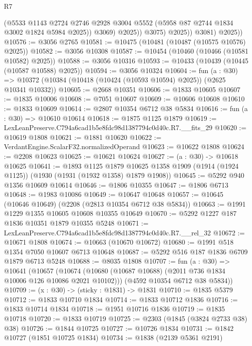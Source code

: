 \begin{lexlean}{R7}
\begin{coremodule}
                      (@5533
                        @1143
                        @2724
                        @2746
                        @2928
                        @3004
                        @5552
                        (@5958 @87 @2744 @1834 @3002 @1824 @5984 @2025))
                      @3069)
                    @2025))
                @3075)
              @2025))
          @3081)
        @2025))
@10576 := @3056 @2765
@10581 := @10475 (@10481 (@10487 (@10575 @10576) @2025))
@10582 := @3056 @10308
@10587 := @10454 (@10460 (@10466 (@10581 @10582) @2025))
@10588 := @3056 @10316
@10593 := @10433 (@10439 (@10445 (@10587 @10588) @2025))
@10594 := @3056 @10324
@10604 := fun (a : @30) =>
  @10372 (@10384 (@10418 (@10424 (@10593 @10594) @2025)) (@2625 @10341 @10332))
@10605 := @2668 @10351
@10606 := @1833 @10605
@10607 := @1835 @10006
@10608 := @7051 @10607
@10609 := @10606 @10608
@10610 := @1833 @10609
@10614 := @2807 @10354 @6712 @38 @5834
@10616 := fun (a : @30) => @10610 @10614
@10618 := @1875 @1125 @1879
@10619 := LexLeanPreserve.C794a6cad1b5e8fdc98d1387794c0d40c.R7.__fits_29
@10620 := @10619 @1808
@10621 := @1881 @10620
@10622 := VerdantEngine.ScalarF32.normalizedOperand
@10623 := @10622 @1808
@10624 := @2208 @10623
@10625 := @10621 @10624
@10627 := (a : @30) -> @10618 @10625
@10641 := @1893
    @1125
    @1879
    @10625
    @1358
    @1909
    (@1914 (@1924 @1125))
    (@1930 (@1931 (@1932 @1358) @1879 @1908))
@10645 := @5292 @940 @1356 @10609 @10614
@10646 := @1806 @10355
@10647 := @1806 @6713
@10648 := @1983 @10086
@10649 := @10647 @10648
@10657 := @10645 (@10646 @10649) (@2208 (@2813 @10354 @6712 @38 @5834))
@10663 := @1991 @1229 @1355 @10605 @10608 @10355 @10649
@10670 := @5292 @1227 @187 @1836 @10351 @1879 @10355 @5248
@10671 := LexLeanPreserve.C794a6cad1b5e8fdc98d1387794c0d40c.R7.__rel_32
@10672 := @10671 @1808
@10674 := @10663 (@10670 @10672)
@10680 := @1991 @518 @1354 @7050 @10607 @6713 @10648
@10687 := @5292 @516 @187 @1836 @6709 @1879 @6713 @5248
@10688 := @8035 @1808
@10707 := fun (a : @30) =>
  @10641
    (@10657
      (@10674 (@10680 (@10687 @10688) (@2011 @736 @1834 @10006 @126 @10086 @2021 @10102)))
      (@4592 @10354 @6712 @38 @5834))
@10709 := (x : @30) -> (sticky : @1831) -> @1831
@10710 := @1835 @5379
@10712 := @1833 @10710 @1834
@10714 := @1833 @10712 @1836
@10716 := @1833 @10714 @1834
@10718 := @1951 @10716 @1836
@10719 := @1835 @10718
@10720 := @1833 @10719
@10725 := @2303 (@1845 (@3824 @2733 @38) @38)
@10726 := @1844 @10725
@10727 := @10726 @1834
@10731 := @1842 @10727 (@1851 @10725 @1834)
@10734 := @1838 (@2139 @5361 @2191)

\end{coremodule}
\end{lexlean}
